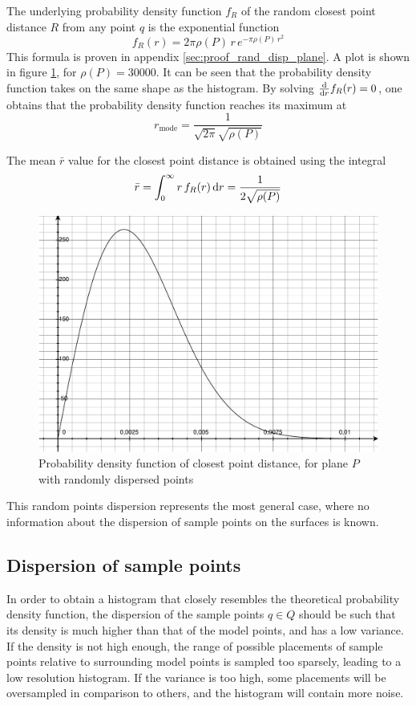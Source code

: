 The underlying probability density function $f_R$ of the random closest point distance $R$ from any point $q$ is the exponential function
\begin{equation}
f_R(r) = 2 \pi \rho(P) \, r \, e^{-\pi \rho(P) \, r^2}
\end{equation}
This formula is proven in appendix \ref{sec:proof_rand_disp_plane}. A plot is shown in figure \ref{fig:plane_rand_d}, for $\rho(P) = 30000$. It can be seen that the probability density function takes on the same shape as the histogram. By solving $\frac{\mathrm{d}}{\mathrm{d} r} f_R(r) = 0$, one obtains that the probability density function reaches its maximum at
\begin{equation}
r_{\text{mode}} = \frac{1}{\sqrt{2 \pi} \sqrt{\rho(P)}}
\end{equation}

The mean $\bar{r}$ value for the closest point distance is obtained using the integral
\begin{equation}
\bar{r} = \int_{0}^{\infty} r \, f_R(r) \, \mathrm{d} r = \frac{1}{2 \sqrt{\rho(P)}}
\end{equation}

\begin{figure}[p]
\centering
\includegraphics[width=.5\textwidth]{fig/plane_rand_d.pdf}
\caption{Probability density function of closest point distance, for plane $P$ with randomly dispersed points}
\label{fig:plane_rand_d}
\end{figure}

This random points dispersion represents the most general case, where no information about the dispersion of sample points on the surfaces is known. 



\subsection{Dispersion of sample points}
In order to obtain a histogram that closely resembles the theoretical probability density function, the dispersion of the sample points $q \in Q$ should be such that its density is much higher than that of the model points, and has a low variance. If the density is not high enough, the range of possible placements of sample points relative to surrounding model points is sampled too sparsely, leading to a low resolution histogram. If the variance is too high, some placements will be oversampled in comparison to others, and the histogram will contain more noise.

